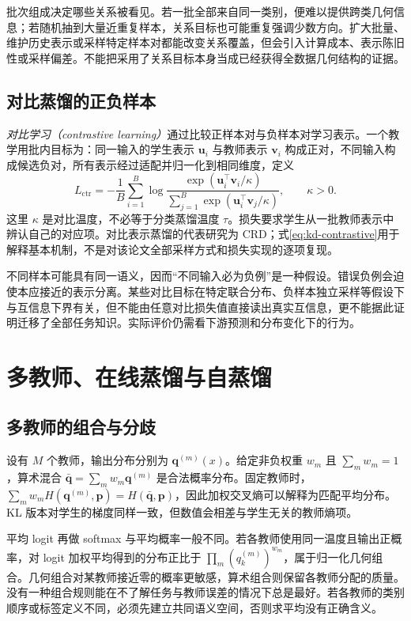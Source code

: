 \documentclass[UTF8,12pt,a4paper,fontset=fandol]{ctexart}
\begin{document}
批次组成决定哪些关系被看见。若一批全部来自同一类别，便难以提供跨类几何信息；若随机抽到大量近重复样本，关系目标也可能重复强调少数方向。扩大批量、维护历史表示或采样特定样本对都能改变关系覆盖，但会引入计算成本、表示陈旧性或采样偏差。不能把采用了关系目标本身当成已经获得全数据几何结构的证据。

\subsection{对比蒸馏的正负样本}
\emph{对比学习（contrastive learning）}通过比较正样本对与负样本对学习表示。一个教学用批内目标为：同一输入的学生表示 $\mathbf u_i$ 与教师表示 $\mathbf v_i$ 构成正对，不同输入构成候选负对，所有表示经过适配并归一化到相同维度，定义
\begin{equation}
 L_{\mathrm{ctr}}=-\frac1B\sum_{i=1}^B
 \log\frac{\exp(\mathbf u_i^\top\mathbf v_i/\kappa)}
 {\sum_{j=1}^B\exp(\mathbf u_i^\top\mathbf v_j/\kappa)},\qquad \kappa>0.
 \label{eq:kd-contrastive}
\end{equation}
这里 $\kappa$ 是对比温度，不必等于分类蒸馏温度 $\tau$。损失要求学生从一批教师表示中辨认自己的对应项。对比表示蒸馏的代表研究为 CRD\cite{tian2020}；式\eqref{eq:kd-contrastive}用于解释基本机制，不是对该论文全部采样方式和损失实现的逐项复现。

不同样本可能具有同一语义，因而“不同输入必为负例”是一种假设。错误负例会迫使本应接近的表示分离。某些对比目标在特定联合分布、负样本独立采样等假设下与互信息下界有关，但不能由任意对比损失值直接读出真实互信息，更不能据此证明迁移了全部任务知识。实际评价仍需看下游预测和分布变化下的行为。

\section{多教师、在线蒸馏与自蒸馏}
\label{sec:kd-training-schemes}

\subsection{多教师的组合与分歧}
设有 $M$ 个教师，输出分布分别为 $\mathbf q^{(m)}(x)$。给定非负权重 $w_m$ 且 $\sum_mw_m=1$，算术混合 $\bar{\mathbf q}=\sum_mw_m\mathbf q^{(m)}$ 是合法概率分布。固定教师时，$\sum_mw_mH(\mathbf q^{(m)},\mathbf p)=H(\bar{\mathbf q},\mathbf p)$，因此加权交叉熵可以解释为匹配平均分布。KL 版本对学生的梯度同样一致，但数值会相差与学生无关的教师熵项。

平均 logit 再做 softmax 与平均概率一般不同。若各教师使用同一温度且输出正概率，对 logit 加权平均得到的分布正比于 $\prod_m(q_k^{(m)})^{w_m}$，属于归一化几何组合。几何组合对某教师接近零的概率更敏感，算术组合则保留各教师分配的质量。没有一种组合规则能在不了解任务与教师误差的情况下总是最好。若各教师的类别顺序或标签定义不同，必须先建立共同语义空间，否则求平均没有正确含义。
\end{document}
